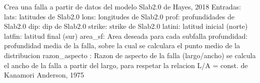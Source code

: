 \documentclass[letterpaper,10pt,english]{sphinxmanual}
\begin{document}

\begin{fulllineitems}
\label{\detokenize{main:main.crea_falla}}
\pysigstartsignatures
{}
\pysigstopsignatures
\sphinxAtStartPar
Crea una falla a partir de datos del modelo Slab2.0 de Hayes, 2018
Entradas:
lats: latitudes de Slab2.0
lons: longitudes de Slab2.0
prof: profundidades de Slab2.0
dip: dip de Slab2.0
strike: strike de Slab2.0
latini: latitud inicial (norte)
latfin: latitud final (sur)
area\_sf: Area deseada para cada subfalla
profundidad: profundidad media de la falla, sobre la cual se calculara el punto medio de la distribucion
razon\_aspecto : Razon de aspecto de la falla (largo/ancho) se calcula el ancho de la falla a partir del largo, para respetar la relacion L/A = const. de Kanamori Anderson, 1975

\end{fulllineitems}


\begin{fulllineitems}
\label{\detokenize{main:main.deg2km}}
\pysigstartsignatures
{}
\pysigstopsignatures
\end{fulllineitems}


\begin{fulllineitems}
\label{\detokenize{main:main.dist_haversine}}
\pysigstartsignatures
{}
\pysigstopsignatures
\end{fulllineitems}
\end{document}
